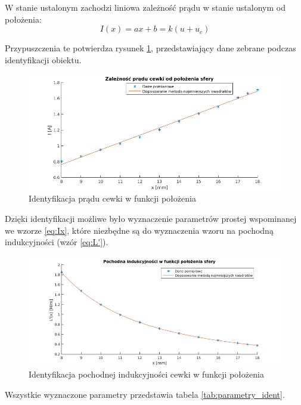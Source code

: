 W stanie ustalonym zachodzi liniowa zależność prądu w stanie ustalonym od położenia:
\begin{equation} \label{eq:Ix}
I(x) = ax + b = k(u + u_c)
\end{equation}

Przypuszczenia te potwierdza rysunek \ref{rys:prad_od_polozenia}, przedstawiający dane zebrane podczas identyfikacji obiektu.

\begin{figure}[H]
\centering
\includegraphics[scale=0.75]{img/identyfikacja_prad_cewki_od_polozenia.png}
\caption{Identyfikacja prądu cewki w funkcji położenia}
\label{rys:prad_od_polozenia}
\end{figure}

Dzięki identyfikacji możliwe było wyznaczenie parametrów prostej wspominanej we wzorze \ref{eq:Ix}, które niezbędne są do wyznaczenia wzoru na pochodną indukcyjności (wzór \ref{eq:L'}).

\begin{figure}[H]
\centering
\includegraphics[scale=0.75]{img/identyfikacja_pochodna_indykcyjnosci_od_polozenia.png}
\caption{Identyfikacja pochodnej indukcyjności cewki w funkcji położenia}
\label{rys:pochodna_od_polozenia}
\end{figure}

Wszystkie wyznaczone parametry przedstawia tabela \ref{tab:parametry_ident}.

